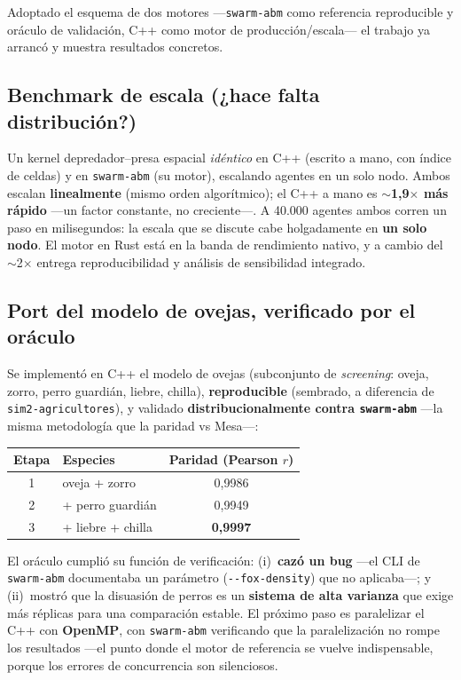 \documentclass[11pt,a4paper]{article}
\newcommand{\code}[1]{\texttt{\small #1}}
\begin{document}
Adoptado el esquema de dos motores —\code{swarm-abm} como referencia reproducible
y oráculo de validación, C++ como motor de producción/escala— el trabajo ya
arrancó y muestra resultados concretos.

\subsection*{Benchmark de escala (¿hace falta distribución?)}
Un kernel depredador--presa espacial \emph{idéntico} en C++ (escrito a mano, con
índice de celdas) y en \code{swarm-abm} (su motor), escalando agentes en un solo
nodo. Ambos escalan \textbf{linealmente} (mismo orden algorítmico); el C++ a mano
es \textbf{$\sim$1,9$\times$ más rápido} —un factor constante, no creciente—. A
40.000 agentes ambos corren un paso en milisegundos: la escala que se discute
cabe holgadamente en \textbf{un solo nodo}. El motor en Rust está en la banda de
rendimiento nativo, y a cambio del $\sim$2$\times$ entrega reproducibilidad y
análisis de sensibilidad integrado.

\subsection*{Port del modelo de ovejas, verificado por el oráculo}
Se implementó en C++ el modelo de ovejas (subconjunto de \emph{screening}: oveja,
zorro, perro guardián, liebre, chilla), \textbf{reproducible} (sembrado, a
diferencia de \code{sim2-agricultores}), y validado \textbf{distribucionalmente
contra \code{swarm-abm}} —la misma metodología que la paridad vs Mesa—:

\begin{center}
\renewcommand{\arraystretch}{1.2}
\begin{tabular}{c l c}
\toprule
\textbf{Etapa} & \textbf{Especies} & \textbf{Paridad (Pearson $r$)} \\
\midrule
1 & oveja + zorro & 0,9986 \\
2 & + perro guardián & 0,9949 \\
3 & + liebre + chilla & \textbf{0,9997} \\
\bottomrule
\end{tabular}
\end{center}

El oráculo cumplió su función de verificación: (i)~\textbf{cazó un bug} —el CLI de
\code{swarm-abm} documentaba un parámetro (\code{-{}-fox-density}) que no
aplicaba—; y (ii)~mostró que la disuasión de perros es un \textbf{sistema de alta
varianza} que exige más réplicas para una comparación estable. El próximo paso es
paralelizar el C++ con \textbf{OpenMP}, con \code{swarm-abm} verificando que la
paralelización no rompe los resultados —el punto donde el motor de referencia se
vuelve indispensable, porque los errores de concurrencia son silenciosos.
\end{document}
